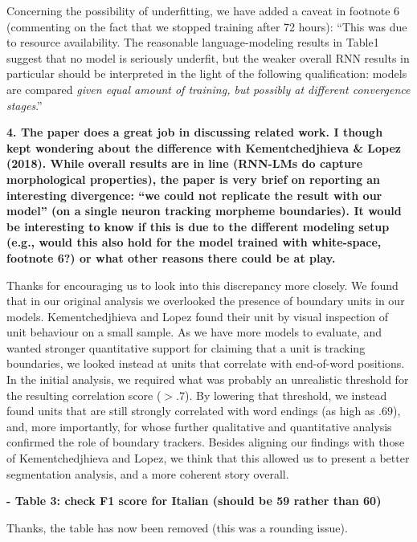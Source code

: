 \documentclass{article}
\begin{document}
Concerning the possibility of underfitting, we have added a caveat in footnote 6 (commenting on the fact that we stopped training after 72 hours):  ``This was due to resource availability. The reasonable language-modeling results in Table1 suggest that no model is seriously underfit, but the weaker overall RNN results in particular should be interpreted in the light of the following qualification:  models are compared \emph{given equal amount of training, but possibly at different convergence stages}.''
\newline

\textbf{4. The paper does a great job in discussing related work. I though kept wondering about the difference with Kementchedjhieva \& Lopez (2018). While overall results are in line (RNN-LMs do capture morphological properties), the paper is very brief on reporting an interesting divergence: ``we could not replicate the result with our model'' (on a single neuron tracking morpheme boundaries). It would be interesting to know if this is due to the different modeling setup (e.g., would this also hold for the model trained with white-space, footnote 6?) or what other reasons there could be at play.}

Thanks for encouraging us to look into this discrepancy more closely. We found that in our original analysis we overlooked the presence of boundary units in our models. Kementchedjhieva and Lopez found their unit by visual inspection of unit behaviour on a small sample. As we have more models to evaluate, and wanted stronger quantitative support for claiming that a unit is tracking boundaries, we looked instead at units that correlate with end-of-word positions. In the initial analysis, we required what was probably an unrealistic threshold for the resulting correlation score ($>.7$). By lowering that threshold, we instead found units that are still strongly correlated with word endings (as high as $.69$), and, more importantly, for whose further qualitative and quantitative analysis confirmed the role of boundary trackers. Besides aligning our findings with those of Kementchedjhieva and Lopez, we think that this allowed us to present a better segmentation analysis, and a more coherent story overall.
\newline

\textbf{- Table 3: check F1 score for Italian (should be 59 rather than 60)}

Thanks, the table has now been removed (this was a rounding issue).
\newline
\end{document}
